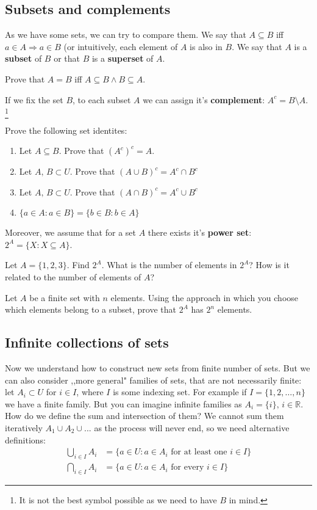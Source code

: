 \subsection{Subsets and complements}
\noindent As we have some sets, we can try to compare them. We say that $A\subseteq B$ iff 
$a\in A\Rightarrow a\in B$ (or intuitively, each element of $A$ is also in $B$. We say that $A$ is 
a \textbf{subset} of $B$ or that $B$ is a \textbf{superset} of $A$. 

\begin{prob}
	Prove that $A=B$ iff $A\subseteq B \wedge B\subseteq A.$
\end{prob}

\noindent If we fix the set $B$, to each subset $A$
we can assign it's \textbf{complement}: $A^c=B\setminus A$. \footnote{It is not the best symbol possible as we need to have $B$ in mind.} 

\begin{prob}
	Prove the following set identites:
	\begin{enumerate}
		\item Let $A\subseteq B.$ Prove that $(A^c)^c = A$.
		\item Let $A,\, B\subset U$. Prove that $(A\cup B)^c = A^c\cap B^c$
		\item Let $A,\, B\subset U$. Prove that $(A\cap B)^c = A^c\cup B^c$
		\item $\{a\in A : a\in B\} = \{b\in B : b\in A\}$
	\end{enumerate}
\end{prob}

Moreover, we assume that for a set $A$ there exists it's \textbf{power set}:
$2^A = \{X : X\subseteq A\}$.

\begin{prob}
	\item Let $A=\{1,2,3\}$. Find $2^A$. What is the number of elements in $2^A$? How is it related to the
	number of elements of $A$?
	\item Let $A$ be a finite set with $n$ elements. Using the approach in which you choose which elements belong
		to a subset, prove that $2^A$ has $2^n$ elements.
\end{prob}

\subsection{Infinite collections of sets}
Now we understand how to construct new sets from finite number of sets. But we can also consider ,,more general" families
of sets, that are not necessarily finite:
let $A_i\subset U$ for $i\in I$, where $I$ is some indexing set. For example if $I=\{1,2,\dots,n\}$ we have a finite family. But you can imagine infinite families as $A_i = \{i\},\,i \in \mathbb{R}$. How do we define
the sum and intersection of them? We cannot sum them iteratively $A_1\cup A_2\cup ...$ as the process will never
end, so we need alternative definitions:
\begin{align*}
	\bigcup_{i\in I}A_i &= \{a\in U : a\in A_i \text{ for at least one }i\in I\}\\
	\bigcap_{i\in I}A_i &= \{a\in U : a\in A_i \text{ for every }i\in I\}
\end{align*}

